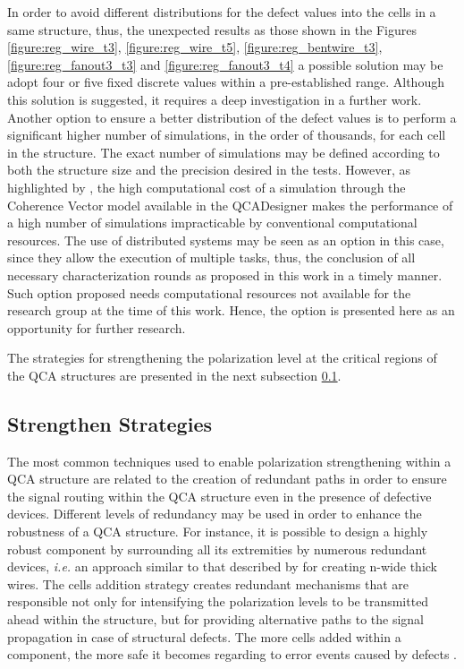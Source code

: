 In order to avoid different distributions for the defect values into the cells in a same structure, thus, the unexpected results \textemdash as those shown in the Figures \ref{figure:reg_wire_t3},  \ref{figure:reg_wire_t5}, \ref{figure:reg_bentwire_t3}, \ref{figure:reg_fanout3_t3} and \ref{figure:reg_fanout3_t4} \textemdash a possible solution may be adopt four or five fixed discrete values within a pre-established range. Although this solution is suggested, it requires a deep investigation in a further work. Another option to ensure a better distribution of the defect values is to perform a significant higher number of simulations, in the order of thousands, for each cell in the structure. The exact number of simulations may be defined according to both the structure size and the precision desired in the tests. However, as highlighted by , the high computational cost of a simulation through the Coherence Vector model available in the QCADesigner makes the performance of a high number of simulations impracticable by conventional computational resources. The use of distributed systems may be seen as an option in this case, since they allow the execution of multiple tasks, thus, the conclusion of all necessary characterization rounds as proposed in this work in a timely manner. Such option proposed needs computational resources not available for the research group at the time of this work. Hence, the option is presented here as an opportunity for further research.

The strategies for strengthening the polarization level at the critical regions of the QCA structures are presented in the next subsection \ref{Strengthen_Strategies}.

\subsection{Strengthen Strategies}
\label{Strengthen_Strategies}

The most common techniques used to enable polarization strengthening within a QCA structure are related to the creation of redundant paths in order to ensure the signal routing within the QCA structure even in the presence of defective devices. Different levels of redundancy may be used in order to enhance the robustness of a QCA structure. For instance, it is possible to design a highly robust component by surrounding all its extremities by numerous redundant devices, \textit{i.e.} an approach similar to that described by  for creating n-wide thick wires. The cells addition strategy creates redundant mechanisms that are responsible not only for intensifying the polarization levels to be transmitted ahead within the structure, but for providing alternative paths to the signal propagation in case of structural defects. The more cells added within a component, the more safe it becomes regarding to error events caused by defects \cite{timothy09}.

